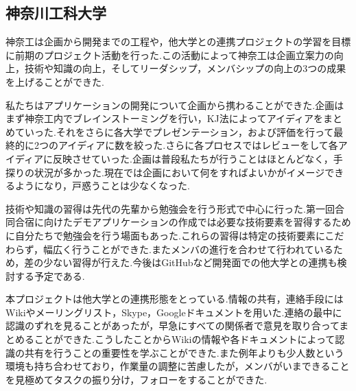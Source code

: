 \subsection{神奈川工科大学}
\par 神奈工は企画から開発までの工程や，他大学との連携プロジェクトの学習を目標に前期のプロジェクト活動を行った.この活動によって神奈工は企画立案力の向上，技術や知識の向上，そしてリーダシップ，メンバシップの向上の3つの成果を上げることができた.
\par 私たちはアプリケーションの開発について企画から携わることができた.企画はまず神奈工内でブレインストーミングを行い，KJ法によってアイディアをまとめていった.それをさらに各大学でプレゼンテーション，および評価を行って最終的に2つのアイディアに数を絞った.さらに各プロセスではレビューをして各アイディアに反映させていった.企画は普段私たちが行うことはほとんどなく，手探りの状況が多かった.現在では企画において何をすればよいかがイメージできるようになり，戸惑うことは少なくなった.
\par 技術や知識の習得は先代の先輩から勉強会を行う形式で中心に行った.第一回合同合宿に向けたデモアプリケーションの作成では必要な技術要素を習得するために自分たちで勉強会を行う場面もあった.これらの習得は特定の技術要素にこだわらず，幅広く行うことができた.またメンバの進行を合わせて行われているため，差の少ない習得が行えた.今後はGitHubなど開発面での他大学との連携も検討する予定である.
\par 本プロジェクトは他大学との連携形態をとっている.情報の共有，連絡手段にはWikiやメーリングリスト，Skype，Googleドキュメントを用いた.連絡の最中に認識のずれを見ることがあったが，早急にすべての関係者で意見を取り合ってまとめることができた.こうしたことからWikiの情報や各ドキュメントによって認識の共有を行うことの重要性を学ぶことができた.また例年よりも少人数という環境も持ち合わせており，作業量の調整に苦慮したが，メンバがいまできることを見極めてタスクの振り分け，フォローをすることができた.
